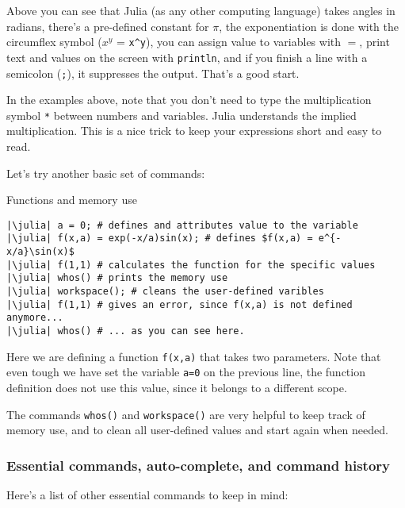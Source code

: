 Above you can see that Julia (as any other computing language) takes angles in radians, there's a pre-defined constant for $\pi$, the exponentiation is done with the circumflex symbol ($x^y$ = \texttt{x\textasciicircum y}), you can assign value to variables with $=$, print text and values on the screen with \texttt{println}, and if you finish a line with a semicolon (\texttt{;}), it suppresses the output. That's a good start.

In the examples above, note that you don't need to type the multiplication symbol \texttt{*} between numbers and variables. Julia understands the implied multiplication. This is a nice trick to keep your expressions short and easy to read.

Let's try another basic set of commands:

\begin{example}{Functions and memory use}
\begin{verbatim}
|\julia| a = 0; # defines and attributes value to the variable
|\julia| f(x,a) = exp(-x/a)sin(x); # defines $f(x,a) = e^{-x/a}\sin(x)$
|\julia| f(1,1) # calculates the function for the specific values
|\julia| whos() # prints the memory use
|\julia| workspace(); # cleans the user-defined varibles
|\julia| f(1,1) # gives an error, since f(x,a) is not defined anymore...
|\julia| whos() # ... as you can see here.
\end{verbatim}
\end{example}

Here we are defining a function \texttt{f(x,a)} that takes two parameters. Note that even tough we have set the variable \texttt{a=0} on the previous line, the function definition does not use this value, since it belongs to a different scope.

The commands \texttt{whos()} and \texttt{workspace()} are very helpful to keep track of memory use, and to clean all user-defined values and start again when needed.

\subsubsection{Essential commands, auto-complete, and command history}

Here's a list of other essential commands to keep in mind:

